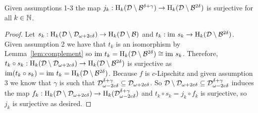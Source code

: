 \begin{lemma}\label{lem:jsurj}
    Given assumptions 1-3 the map $j_k:\mathrm{H}_k({\mathcal{D}}\setminus{\mathcal{B}}^{\delta+\gamma})\to\mathrm{H}_k({\mathcal{D}}\setminus{\mathcal{B}}^{2\delta})$ is surjective for all $k\in\mathbb{N}$.
\end{lemma}
\begin{proof}
    Let $s_k : \mathrm{H}_k({\mathcal{D}}\setminus{\mathcal{D}}_{\omega+2c\delta})\to\mathrm{H}_k({\mathcal{D}}\setminus{\mathcal{B}})$ and $t_k : \mathrm{im}~s_k\to\mathrm{H}_k({\mathcal{D}}\setminus{\mathcal{B}}^{2\delta})$.
    Given assumption 2 we have that $t_k$ is an isomorphism by Lemma~\ref{lem:complement} so $\mathrm{im}~t_k = \mathrm{H}_k({\mathcal{D}}\setminus{\mathcal{B}}^{2\delta})\cong\mathrm{im}~s_k$.
    Therefore, $t_k\circ s_k : \mathrm{H}_k({\mathcal{D}}\setminus{\mathcal{D}}_{\omega+2c\delta})\to\mathrm{H}_k({\mathcal{D}}\setminus{\mathcal{B}}^{2\delta})$ is surjective as $\mathrm{im}(t_k\circ s_k) = \mathrm{im}~t_k = \mathrm{H}_k({\mathcal{D}}\setminus{\mathcal{B}}^{2\delta})$.
    Because $f$ is $c$-Lipschitz and given assumption 3 we know that $\gamma$ is such that ${\mathcal{D}}_{\omega-2c\delta}^{\delta+\gamma}\subseteq {\mathcal{D}}_{\omega+2c\delta}$.
    So ${\mathcal{D}}\setminus{\mathcal{D}}_{\omega+2c\delta}\subseteq{\mathcal{D}}_{\omega-2c\delta}^{\delta+\gamma}$ induces the map $f_k : \mathrm{H}_k({\mathcal{D}}\setminus{\mathcal{D}}_{\omega+2c\delta})\to\mathrm{H}_k({\mathcal{D}}_{\omega-2c\delta}^{\delta+\gamma})$ and $t_k\circ s_k = j_k\circ f_k$ is surjective, so $j_k$ is surjective as desired.
\end{proof}

